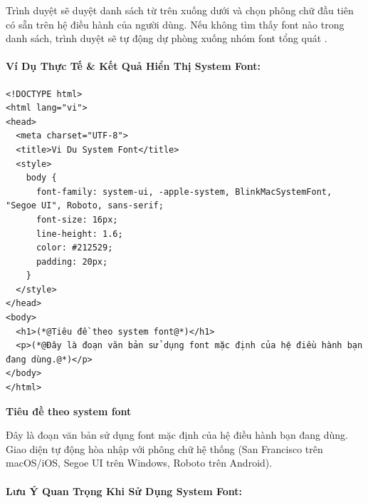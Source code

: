 \begin{tipBox}
Trình duyệt sẽ duyệt danh sách từ trên xuống dưới và chọn phông chữ đầu tiên có sẵn trên hệ điều hành của người dùng. Nếu không tìm thấy font nào trong danh sách, trình duyệt sẽ tự động dự phòng xuống nhóm font tổng quát .
\end{tipBox}

\paragraph{Ví Dụ Thực Tế \& Kết Quả Hiển Thị System Font:}

\begin{codeWindow}
\begin{lstlisting}[language=HTML5]
<!DOCTYPE html>
<html lang="vi">
<head>
  <meta charset="UTF-8">
  <title>Vi Du System Font</title>
  <style>
    body {
      font-family: system-ui, -apple-system, BlinkMacSystemFont, "Segoe UI", Roboto, sans-serif;
      font-size: 16px;
      line-height: 1.6;
      color: #212529;
      padding: 20px;
    }
  </style>
</head>
<body>
  <h1>(*@Tiêu đề theo system font@*)</h1>
  <p>(*@Đây là đoạn văn bản sử dụng font mặc định của hệ điều hành bạn đang dùng.@*)</p>
</body>
</html>
\end{lstlisting}
\end{codeWindow}

\begin{browserWindow}
\sffamily\small
\begin{tcolorbox}[arc=4pt, colback=white, colframe=primaryBlue!30, boxrule=0.8pt, top=12pt, bottom=12pt, left=14pt, right=14pt]
  {\fontsize{18}{22}\selectfont\bfseries\color{primaryBlue} Tiêu đề theo system font} \par\vspace{6pt}
  {\fontsize{12}{16}\selectfont Đây là đoạn văn bản sử dụng font mặc định của hệ điều hành bạn đang dùng. Giao diện tự động hòa nhập với phông chữ hệ thống (San Francisco trên macOS/iOS, Segoe UI trên Windows, Roboto trên Android).}
\end{tcolorbox}
\end{browserWindow}

\paragraph{Lưu Ý Quan Trọng Khi Sử Dụng System Font:}

